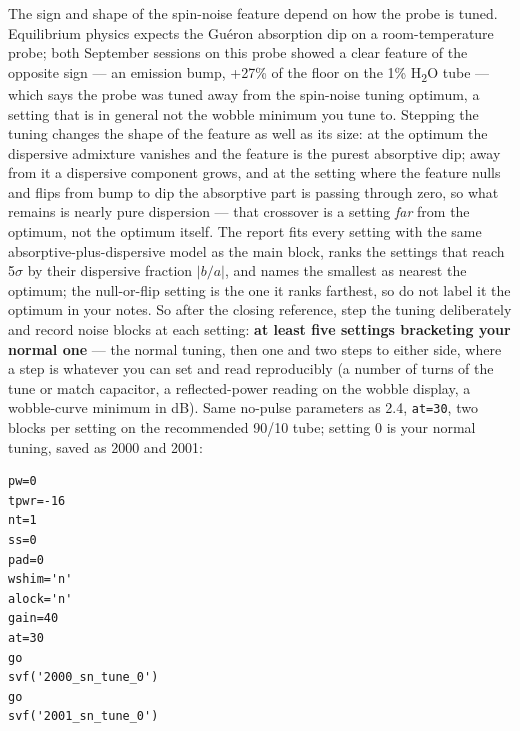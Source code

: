 \documentclass[11pt]{article}
\newcommand{\htwo}{H\textsubscript{2}O}
\begin{document}
The sign and shape of the spin-noise feature depend on how the probe
is tuned. Equilibrium physics expects the Gu\'eron absorption dip on a
room-temperature probe; both September sessions on this probe showed a
clear feature of the opposite sign --- an emission bump, +27\% of the
floor on the 1\% \htwo{} tube --- which says the probe was tuned away
from the spin-noise tuning optimum, a setting that is in general not
the wobble minimum you tune to. Stepping the tuning changes the shape
of the feature as well as its size: at the optimum the dispersive
admixture vanishes and the feature is the purest absorptive dip; away
from it a dispersive component grows, and at the setting where the
feature nulls and flips from bump to dip the absorptive part is
passing through zero, so what remains is nearly pure dispersion ---
that crossover is a setting \emph{far} from the optimum, not the
optimum itself. The report fits every setting with the same
absorptive-plus-dispersive model as the main block, ranks the settings
that reach 5$\sigma$ by their dispersive fraction $|b/a|$, and names
the smallest as nearest the optimum; the null-or-flip setting is the
one it ranks farthest, so do not label it the optimum in your notes.
So after the closing reference, step the tuning
deliberately and record noise blocks at each setting: \textbf{at
least five settings bracketing your normal one} --- the normal tuning,
then one and two steps to either side, where a step is whatever you
can set and read reproducibly (a number of turns of the tune or match
capacitor, a reflected-power reading on the wobble display, a
wobble-curve minimum in dB). Same no-pulse parameters as 2.4,
\texttt{at=30}, two blocks per setting on the recommended 90/10 tube;
setting 0 is your normal tuning, saved as 2000 and 2001:

\begin{lstlisting}
pw=0
tpwr=-16
nt=1
ss=0
pad=0
wshim='n'
alock='n'
gain=40
at=30
go
svf('2000_sn_tune_0')
go
svf('2001_sn_tune_0')
\end{lstlisting}
\end{document}
